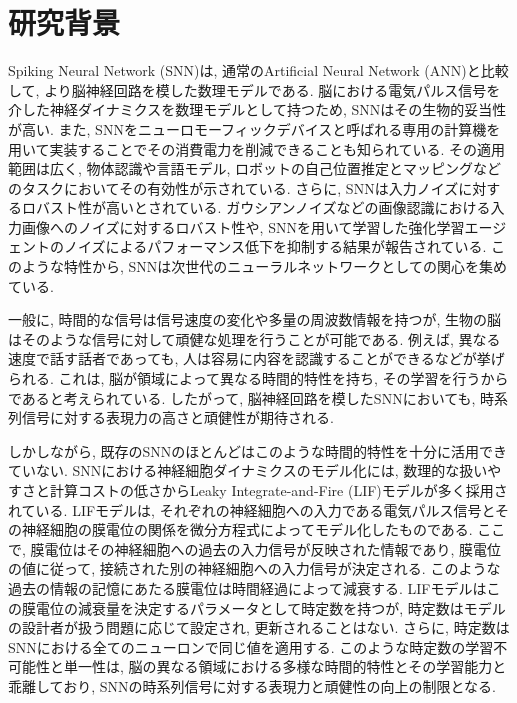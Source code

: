 \section{研究背景}
Spiking Neural Network (SNN)は, 通常のArtificial Neural Network (ANN)と比較して, より脳神経回路を模した数理モデルである.
脳における電気パルス信号を介した神経ダイナミクスを数理モデルとして持つため, SNNはその生物的妥当性が高い.
また, SNNをニューロモーフィックデバイスと呼ばれる専用の計算機を用いて実装することでその消費電力を削減できることも知られている.
その適用範囲は広く, 物体認識や言語モデル, ロボットの自己位置推定とマッピングなどのタスクにおいてその有効性が示されている\cite{yamazaki2022spiking, snnyolo, s23063037, spinnaker,snnslam}.
さらに, SNNは入力ノイズに対するロバスト性が高いとされている.
ガウシアンノイズなどの画像認識における入力画像へのノイズに対するロバスト性\cite{zhao2022spiking}や, SNNを用いて学習した強化学習エージェントのノイズによるパフォーマンス低下を抑制する結果が報告されている\cite{patel2019improved}.
このような特性から, SNNは次世代のニューラルネットワークとしての関心を集めている\cite{maass1997networks}.

一般に, 時間的な信号は信号速度の変化や多量の周波数情報を持つが, 生物の脳はそのような信号に対して頑健な処理を行うことが可能である.
例えば, 異なる速度で話す話者であっても, 人は容易に内容を認識することができるなどが挙げられる.
これは, 脳が領域によって異なる時間的特性を持ち, その学習を行うからであると考えられている\cite{mattia2002population, deco2019brain}.
したがって, 脳神経回路を模したSNNにおいても, 時系列信号に対する表現力の高さと頑健性が期待される\cite{dhsnn}.

しかしながら, 既存のSNNのほとんどはこのような時間的特性を十分に活用できていない\cite{dhsnn}.
SNNにおける神経細胞ダイナミクスのモデル化には, 数理的な扱いやすさと計算コストの低さからLeaky Integrate-and-Fire (LIF)モデルが多く採用されている.
LIFモデルは, それぞれの神経細胞への入力である電気パルス信号とその神経細胞の膜電位の関係を微分方程式によってモデル化したものである.
ここで, 膜電位はその神経細胞への過去の入力信号が反映された情報であり, 膜電位の値に従って, 接続された別の神経細胞への入力信号が決定される.
このような過去の情報の記憶にあたる膜電位は時間経過によって減衰する.
LIFモデルはこの膜電位の減衰量を決定するパラメータとして時定数を持つが, 時定数はモデルの設計者が扱う問題に応じて設定され, 更新されることはない.
さらに, 時定数はSNNにおける全てのニューロンで同じ値を適用する.
このような時定数の学習不可能性と単一性は, 脳の異なる領域における多様な時間的特性とその学習能力と乖離しており, SNNの時系列信号に対する表現力と頑健性の向上の制限となる.


